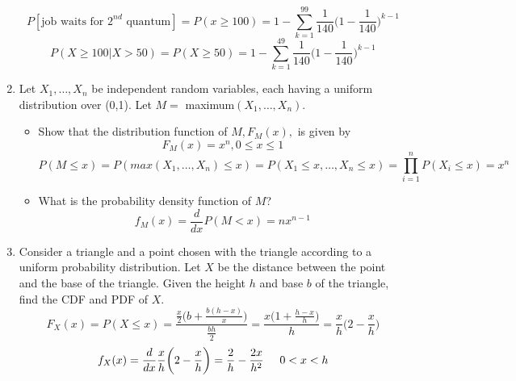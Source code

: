 \documentclass[10.5pt,letterpaper]{article}
\newcommand\tab[1][0.5cm]{\hspace*{#1}}
\begin{document}
\begin{enumerate}[label=\textbf{Problem \arabic*.}]
\[P[\text{job waits for $2^{nd}$ quantum}]=P(x\geq 100)=1-\sum_{k=1}^{99}\frac{1}{140}\bigg(1-\frac{1}{140}\bigg)^{k-1}\]
\[P(X\geq 100|X>50)=P(X\geq 50)=1-\sum_{k=1}^{49}\frac{1}{140}\bigg(1-\frac{1}{140}\bigg)^{k-1}\]
\item Let $X_1,\dots,X_n$ be independent random variables, each having a uniform distribution over (0,1). Let $M = $ maximum$(X_1,\dots,X_n)$.
	\begin{itemize}
		\item Show that the distribution function of $M,F_M(x),$ is given by \[F_M(x)=x^n, 0 \leq x \leq 1\]
		\[P(M\leq x) = P(max(X_1,\dots,X_n)\leq x) = P(X_1 \leq x, \dots, X_n \leq x) = \prod_{i=1}^{n}P(X_i \leq x) = x^n\]
		\item What is the probability density function of $M$?
		\[f_M(x) = \frac{d}{dx}P(M < x) = nx^{n-1}\]
	\end{itemize}
\item Consider a triangle and a point chosen with the triangle according to a uniform probability distribution. Let $X$ be the distance between the point and the base of the triangle. Given the height $h$ and base $b$ of the triangle, find the CDF and PDF of $X$.
\[F_X(x)=P(X\leq x)=\frac{\frac{x}{2}\bigg(b + \frac{b(h-x)}{x}\bigg)}{\frac{bh}{2}} = \frac{x\bigg(1+\frac{h-x}{h}\bigg)}{h} = \frac{x}{h}\bigg(2-\frac{x}{h}\bigg)\]
\[f_X(x)=\frac{d}{dx}\frac{x}{h}\bigg(2-\frac{x}{h}\bigg)=\frac{2}{h}-\frac{2x}{h^2} \tab 0 < x < h\]



\end{enumerate}
\end{document}
